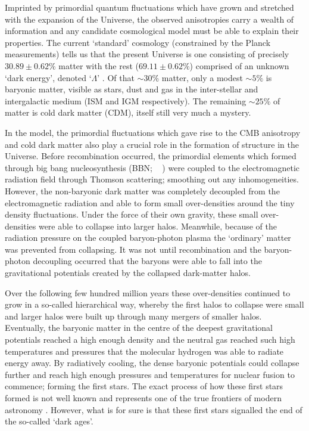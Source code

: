 Imprinted by primordial quantum fluctuations which have grown and stretched with the expansion of the Universe, the observed anisotropies carry a wealth of information and any candidate cosmological model must be able to explain their properties. The current `standard' \cdm{} cosmology (constrained by the Planck measurements) tells us that the present Universe is one consisting of precisely $30.89 \pm 0.62\%$ matter with the rest ($69.11 \pm 0.62\%$) comprised of an unknown `dark energy', denoted `$\Lambda$' \citep{Collaboration:2015tp}. Of that $\sim 30\%$ matter, only a modest $\sim 5\%$ is baryonic matter, visible as stars, dust and gas in the inter-stellar and intergalactic medium (ISM and IGM respectively). The remaining  $\sim 25\%$ of matter is cold dark matter (CDM), itself still very much a mystery.

In the \cdm{} model, the primordial fluctuations which gave rise to the CMB anisotropy and cold dark matter also play a crucial role in the formation of structure in the Universe. Before recombination occurred, the primordial elements which formed through big bang nucleosynthesis (BBN; \citeauthor{Burles:2001kr}~ \citeyear{Burles:2001kr}) were coupled to the electromagnetic radiation field through Thomson scattering; smoothing out any inhomogeneities. However, the non-baryonic dark matter was completely decoupled from the electromagnetic radiation and able to form small over-densities around the tiny density fluctuations. Under the force of their own gravity, these small over-densities were able to collapse into larger halos. Meanwhile, because of the radiation pressure on the coupled baryon-photon plasma the `ordinary' matter was prevented from collapsing. It was not until recombination and the baryon-photon decoupling occurred that the baryons were able to fall into the gravitational potentials created by the collapsed dark-matter halos.

Over the following few hundred million years these over-densities continued to grow in a so-called hierarchical way, whereby the first halos to collapse were small and larger halos were built up through many mergers of smaller halos. Eventually, the baryonic matter in the centre of the deepest gravitational potentials reached a high enough density and the neutral gas reached such high temperatures and pressures that the molecular hydrogen was able to radiate energy away. By radiatively cooling, the dense baryonic potentials could collapse further and reach high enough pressures and temperatures for nuclear fusion to commence; forming the first stars. The exact process of how these first stars formed is not well known and represents one of the true frontiers of modern astronomy \citep{Bromm:2013dk}. However, what is for sure is that these first stars signalled the end of the so-called `dark ages'.

